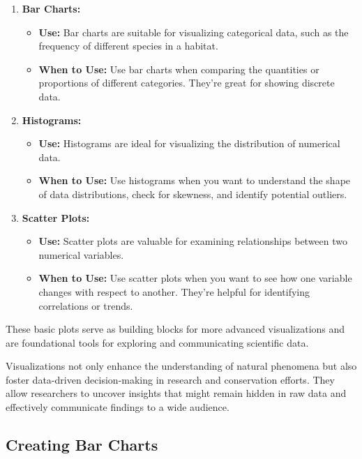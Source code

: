 \documentclass[
  letterpaper,
]{book}
\providecommand{\tightlist}{%
  \setlength{\itemsep}{0pt}\setlength{\parskip}{0pt}}
\begin{document}
\begin{enumerate}
\def\labelenumi{\arabic{enumi}.}
\tightlist
\item
  \textbf{Bar Charts:}

  \begin{itemize}
  \tightlist
  \item
    \textbf{Use:} Bar charts are suitable for visualizing categorical
    data, such as the frequency of different species in a habitat.
  \item
    \textbf{When to Use:} Use bar charts when comparing the quantities
    or proportions of different categories. They're great for showing
    discrete data.
  \end{itemize}
\item
  \textbf{Histograms:}

  \begin{itemize}
  \tightlist
  \item
    \textbf{Use:} Histograms are ideal for visualizing the distribution
    of numerical data.
  \item
    \textbf{When to Use:} Use histograms when you want to understand the
    shape of data distributions, check for skewness, and identify
    potential outliers.
  \end{itemize}
\item
  \textbf{Scatter Plots:}

  \begin{itemize}
  \tightlist
  \item
    \textbf{Use:} Scatter plots are valuable for examining relationships
    between two numerical variables.
  \item
    \textbf{When to Use:} Use scatter plots when you want to see how one
    variable changes with respect to another. They're helpful for
    identifying correlations or trends.
  \end{itemize}
\end{enumerate}

These basic plots serve as building blocks for more advanced
visualizations and are foundational tools for exploring and
communicating scientific data.

Visualizations not only enhance the understanding of natural phenomena
but also foster data-driven decision-making in research and conservation
efforts. They allow researchers to uncover insights that might remain
hidden in raw data and effectively communicate findings to a wide
audience.

\subsection{Creating Bar Charts}\label{creating-bar-charts}
\end{document}
